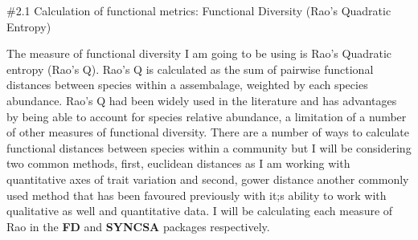 \documentclass[
]{article}
\newenvironment{Shaded}{\begin{snugshade}}{\end{snugshade}}
\newcommand{\AttributeTok}[1]{\textcolor[rgb]{0.77,0.63,0.00}{#1}}
\newcommand{\ControlFlowTok}[1]{\textcolor[rgb]{0.13,0.29,0.53}{\textbf{#1}}}
\newcommand{\DecValTok}[1]{\textcolor[rgb]{0.00,0.00,0.81}{#1}}
\newcommand{\DocumentationTok}[1]{\textcolor[rgb]{0.56,0.35,0.01}{\textbf{\textit{#1}}}}
\newcommand{\FunctionTok}[1]{\textcolor[rgb]{0.00,0.00,0.00}{#1}}
\newcommand{\NormalTok}[1]{#1}
\newcommand{\OtherTok}[1]{\textcolor[rgb]{0.56,0.35,0.01}{#1}}
\newcommand{\SpecialCharTok}[1]{\textcolor[rgb]{0.00,0.00,0.00}{#1}}
\begin{document}
\begin{Shaded}
\end{Shaded}

\#2.1 Calculation of functional metrics: Functional Diversity (Rao's
Quadratic Entropy)

The measure of functional diversity I am going to be using is Rao's
Quadratic entropy (Rao's Q). Rao's Q is calculated as the sum of
pairwise functional distances between species within a assembalage,
weighted by each species abundance. Rao's Q had been widely used in the
literature and has advantages by being able to account for species
relative abundance, a limitation of a number of other measures of
functional diversity. There are a number of ways to calculate functional
distances between species within a community but I will be considering
two common methods, first, euclidean distances as I am working with
quantitative axes of trait variation and second, gower distance another
commonly used method that has been favoured previously with it;s ability
to work with qualitative as well and quantitative data. I will be
calculating each measure of Rao in the \textbf{FD} and \textbf{SYNCSA}
packages respectively.
\end{document}
